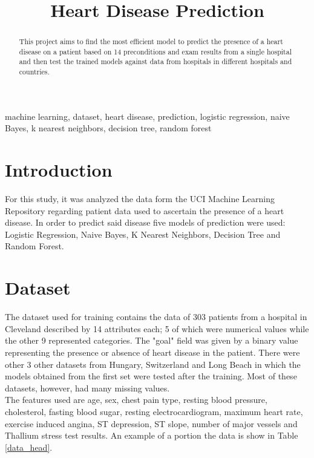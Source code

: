 \documentclass[conference]{IEEEtran}
\begin{document}
\title{Heart Disease Prediction}

\author{
}

\maketitle

\begin{abstract}
    This project aims to find the most efficient model to predict the presence of a heart disease on a patient based on 14 preconditions and exam results from a single hospital and then test the trained models against data from hospitals in different hospitals and countries.
\end{abstract}

\begin{IEEEkeywords}
    machine learning, dataset, heart disease, prediction, logistic regression, naive Bayes, k nearest neighbors, decision tree, random forest
\end{IEEEkeywords}

\section{Introduction}
For this study, it was analyzed the data form the UCI Machine Learning Repository\cite{mlr} regarding patient data used to ascertain the presence of a heart disease. In order to predict said disease five models of prediction were used: Logistic Regression, Naive Bayes, K Nearest Neighbors, Decision Tree and Random Forest.

\section{Dataset}
The dataset used for training contains the data of 303 patients from a hospital in Cleveland\cite{va} described by 14 attributes each; 5 of which were numerical values while the other 9 represented categories. The "goal" field was given by a binary value representing the presence or absence of heart disease in the patient. There were other 3 other datasets from Hungary\cite{hun}, Switzerland\cite{swz1,swz2} and Long Beach\cite{va} in which the models obtained from the first set were tested after the training. Most of these datasets, however, had many missing values.\\
The features used are age, sex, chest pain type, resting blood pressure, cholesterol, fasting blood sugar, resting electrocardiogram, maximum heart rate, exercise induced angina, ST depression, ST slope, number of major vessels and Thallium stress test results. An example of a portion the data is show in Table \ref{data_head}.
\end{document}
